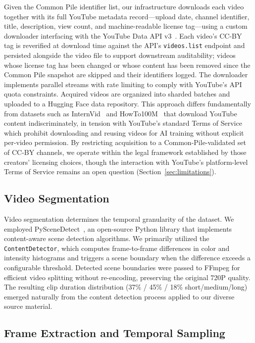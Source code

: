 \documentclass{article}
\begin{document}
Given the Common Pile identifier list, our infrastructure downloads each video together with its full YouTube metadata record---upload date, channel identifier, title, description, view count, and machine-readable license tag---using a custom downloader interfacing with the YouTube Data API v3~\cite{internet_archive_api}. Each video's CC-BY tag is reverified at download time against the API's \texttt{videos.list} endpoint and persisted alongside the video file to support downstream auditability; videos whose license tag has been changed or whose content has been removed since the Common Pile snapshot are skipped and their identifiers logged. The downloader implements parallel streams with rate limiting to comply with YouTube's API quota constraints. Acquired videos are organized into sharded batches and uploaded to a Hugging Face data repository. This approach differs fundamentally from datasets such as InternVid~\cite{wang2024internvid} and HowTo100M~\cite{miech2019howto100m} that download YouTube content indiscriminately, in tension with YouTube's standard Terms of Service which prohibit downloading and reusing videos for AI training without explicit per-video permission. By restricting acquisition to a Common-Pile-validated set of CC-BY channels, we operate within the legal framework established by those creators' licensing choices, though the interaction with YouTube's platform-level Terms of Service remains an open question (Section~\ref{sec:limitations}).

\subsection{Video Segmentation}

Video segmentation determines the temporal granularity of the dataset. We employed PySceneDetect~\cite{castellano2014pyscenedetect}, an open-source Python library that implements content-aware scene detection algorithms. We primarily utilized the \texttt{ContentDetector}, which computes frame-to-frame differences in color and intensity histograms and triggers a scene boundary when the difference exceeds a configurable threshold. Detected scene boundaries were passed to FFmpeg for efficient video splitting without re-encoding, preserving the original 720P quality. The resulting clip duration distribution (37\% / 45\% / 18\% short/medium/long) emerged naturally from the content detection process applied to our diverse source material.

\subsection{Frame Extraction and Temporal Sampling}
\label{app:frame-extraction}
\end{document}
